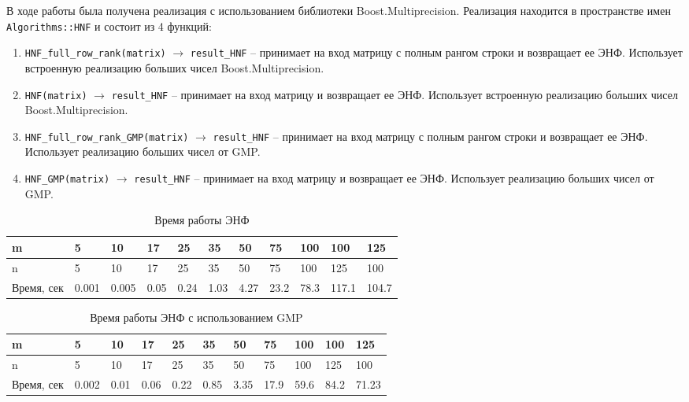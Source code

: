 В ходе работы была получена реализация с использованием библиотеки Boost.Multiprecision. Реализация находится в пространстве имен \verb!Algorithms::HNF! и состоит из 4 функций:

\begin{enumerate}

\item \verb!HNF_full_row_rank(matrix)! $\rightarrow$ \verb!result_HNF! -- принимает на вход матрицу с полным рангом строки и возвращает ее ЭНФ. Использует встроенную реализацию больших чисел Boost.Multiprecision.

\item \verb!HNF(matrix)! $\rightarrow$ \verb!result_HNF! -- принимает на вход матрицу и возвращает ее ЭНФ. Использует встроенную реализацию больших чисел Boost.Multiprecision.

\item \verb!HNF_full_row_rank_GMP(matrix)! $\rightarrow$ \verb!result_HNF! -- принимает на вход матрицу с полным рангом строки и возвращает ее ЭНФ. Использует реализацию больших чисел от GMP.

\item \verb!HNF_GMP(matrix)! $\rightarrow$ \verb!result_HNF! -- принимает на вход матрицу и возвращает ее ЭНФ. Использует реализацию больших чисел от GMP.

\end{enumerate}

\begin{table}[H]
  \caption{Время работы ЭНФ}
  \centering
  \begin{tabular}{ | l | l | l | l | l | l | l | l | l | l | l | }
  \hline
  m & 5 & 10 & 17 & 25 & 35 & 50 & 75 & 100 & 100 & 125 \\ \hline
  n & 5 & 10 & 17 & 25 & 35 & 50 & 75 & 100 & 125 & 100 \\ \hline
  Время, сек & 0.001 & 0.005 & 0.05 & 0.24 & 1.03 & 4.27 & 23.2 & 78.3 & 117.1 & 104.7 \\ \hline
  \end{tabular}
  \label{table:HNF}
\end{table}

\begin{table}[H]
  \caption{Время работы ЭНФ с использованием GMP}
  \centering
  \begin{tabular}{ | l | l | l | l | l | l | l | l | l | l | l | }
  \hline
  m & 5 & 10 & 17 & 25 & 35 & 50 & 75 & 100 & 100 & 125 \\ \hline
  n & 5 & 10 & 17 & 25 & 35 & 50 & 75 & 100 & 125 & 100 \\ \hline
  Время, сек & 0.002 & 0.01 & 0.06 & 0.22 & 0.85 & 3.35 & 17.9 & 59.6 & 84.2 & 71.23 \\ \hline
  \end{tabular}
  \label{table:HNF_GMP}
\end{table}

